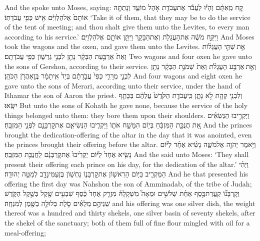 \documentclass[11pt, openany]{book}
\begin{document}
{And the \lord\space spoke unto Moses, saying:}
{קַ֚ח מֵֽאִתָּ֔ם וְהָי֕וּ לַעֲבֹ֕ד אֶת\maqqaf עֲבֹדַ֖ת אֹ֣הֶל מוֹעֵ֑ד וְנָתַתָּ֤ה אוֹתָם֙ אֶל\maqqaf הַלְוִיִּ֔ם אִ֖ישׁ כְּפִ֥י עֲבֹדָתֽוֹ׃}
{‘Take it of them, that they may be to do the service of the tent of meeting; and thou shalt give them unto the Levites, to every man according to his service.’}
{וַיִּקַּ֣ח מֹשֶׁ֔ה אֶת\maqqaf הָעֲגָלֹ֖ת וְאֶת\maqqaf הַבָּקָ֑ר וַיִּתֵּ֥ן אוֹתָ֖ם אֶל\maqqaf הַלְוִיִּֽם׃}
{And Moses took the wagons and the oxen, and gave them unto the Levites.}
{אֵ֣ת \legarmeh  שְׁתֵּ֣י הָעֲגָל֗וֹת וְאֵת֙ אַרְבַּ֣עַת הַבָּקָ֔ר נָתַ֖ן לִבְנֵ֣י גֵרְשׁ֑וֹן כְּפִ֖י עֲבֹדָתָֽם׃}
{Two wagons and four oxen he gave unto the sons of Gershon, according to their service.}
{וְאֵ֣ת \legarmeh  אַרְבַּ֣ע הָעֲגָלֹ֗ת וְאֵת֙ שְׁמֹנַ֣ת הַבָּקָ֔ר נָתַ֖ן לִבְנֵ֣י מְרָרִ֑י כְּפִי֙ עֲבֹ֣דָתָ֔ם בְּיַד֙ אִֽיתָמָ֔ר בֶּֽן\maqqaf אַהֲרֹ֖ן הַכֹּהֵֽן׃}
{And four wagons and eight oxen he gave unto the sons of Merari, according unto their service, under the hand of Ithamar the son of Aaron the priest.}
{וְלִבְנֵ֥י קְהָ֖ת לֹ֣א נָתָ֑ן כִּֽי\maqqaf עֲבֹדַ֤ת הַקֹּ֙דֶשׁ֙ עֲלֵהֶ֔ם בַּכָּתֵ֖ף יִשָּֽׂאוּ׃}
{But unto the sons of Kohath he gave none, because the service of the holy things belonged unto them: they bore them upon their shoulders.}
{וַיַּקְרִ֣יבוּ הַנְּשִׂאִ֗ים אֵ֚ת חֲנֻכַּ֣ת הַמִּזְבֵּ֔חַ בְּי֖וֹם הִמָּשַׁ֣ח אֹת֑וֹ וַיַּקְרִ֧יבוּ הַנְּשִׂיאִ֛ם אֶת\maqqaf קׇרְבָּנָ֖ם לִפְנֵ֥י הַמִּזְבֵּֽחַ׃}
{And the princes brought the dedication-offering of the altar in the day that it was anointed, even the princes brought their offering before the altar.}
{וַיֹּ֥אמֶר יְהֹוָ֖ה אֶל\maqqaf מֹשֶׁ֑ה נָשִׂ֨יא אֶחָ֜ד לַיּ֗וֹם נָשִׂ֤יא אֶחָד֙ לַיּ֔וֹם יַקְרִ֙יבוּ֙ אֶת\maqqaf קׇרְבָּנָ֔ם לַחֲנֻכַּ֖ת הַמִּזְבֵּֽחַ׃ \setuma }
{And the \lord\space said unto Moses: ‘They shall present their offering each prince on his day, for the dedication of the altar.’}
{וַיְהִ֗י הַמַּקְרִ֛יב בַּיּ֥וֹם הָרִאשׁ֖וֹן אֶת\maqqaf קׇרְבָּנ֑וֹ נַחְשׁ֥וֹן בֶּן\maqqaf עַמִּינָדָ֖ב לְמַטֵּ֥ה יְהוּדָֽה׃}
{And he that presented his offering the first day was Nahshon the son of Amminadab, of the tribe of Judah;}
{וְקׇרְבָּנ֞וֹ קַֽעֲרַת\maqqaf כֶּ֣סֶף אַחַ֗ת שְׁלֹשִׁ֣ים וּמֵאָה֮ מִשְׁקָלָהּ֒ מִזְרָ֤ק אֶחָד֙ כֶּ֔סֶף שִׁבְעִ֥ים שֶׁ֖קֶל בְּשֶׁ֣קֶל הַקֹּ֑דֶשׁ שְׁנֵיהֶ֣ם \legarmeh  מְלֵאִ֗ים סֹ֛לֶת בְּלוּלָ֥ה בַשֶּׁ֖מֶן לְמִנְחָֽה׃}
{and his offering was one silver dish, the weight thereof was a hundred and thirty shekels, one silver basin of seventy shekels, after the shekel of the sanctuary; both of them full of fine flour mingled with oil for a meal-offering;}
\end{document}

